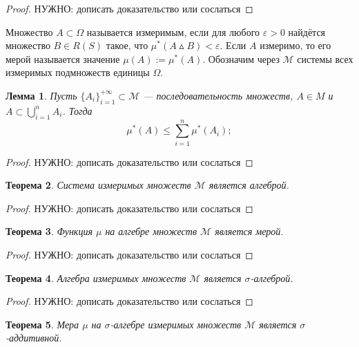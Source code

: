 \documentclass[12pt]{article}
\newtheorem{theorem}{Теорема}
\newtheorem{lemma}[theorem]{Лемма}
\numberwithin{theorem}{section}
\theoremstyle{definition}
\newcommand{\defin}[2]{\hypertarget{#2}{{\color{red} #1}}}
\newcommand{\calM}{\mathcal{M}}
\newcommand{\TODO}[1]{\textcolor{todocolor}{НУЖНО: #1}}
\begin{document}
	\begin{proof}
		\TODO{дописать доказательство или сослаться}
	\end{proof}
	
	Множество $ A \subset \Omega $ называется \defin{измеримым}{measurable-set}, если для любого $ \varepsilon > 0 $
	найдётся множество $ B \in R(S) $ такое, что $ \mu^*(A \vartriangle B) < \varepsilon $.
	Если $ A $ измеримо, то его \defin{мерой}{measure of set} называется значение $ \mu(A) := \mu^*(A) $.
	Обозначим через $ \calM $ системы всех измеримых подмножеств единицы $ \Omega $.
	
	\begin{lemma}
		Пусть $ \{A_i\}_{i = 1}^{+\infty} \subset \calM $ --- последовательность множеств,
		$ A \in M $
		и $ A \subset \bigcup\limits_{i = 1}^{n} A_i $.
		Тогда $$ \mu^*(A) \leqslant \sum\limits_{i = 1}^{n} \mu^*(A_i); $$
	\end{lemma}
	
	\begin{proof}
		\TODO{дописать доказательство или сослаться}
	\end{proof}
	
	\begin{theorem}
		Система измеримых множеств $ \calM $ является алгеброй.
	\end{theorem}
	
	\begin{proof}
		\TODO{дописать доказательство или сослаться}
	\end{proof}
	
	\begin{theorem}
		Функция $ \mu $ на алгебре множеств $ \calM $ является мерой.
	\end{theorem}
	
	\begin{proof}
		\TODO{дописать доказательство или сослаться}
	\end{proof}
	
	\begin{theorem}
		Алгебра измеримых множеств $ \calM $ является $ \sigma $-алгеброй.
	\end{theorem}
	
	\begin{proof}
		\TODO{дописать доказательство или сослаться}
	\end{proof}
	
	\begin{theorem}
		Мера $ \mu $ на $ \sigma $-алгебре измеримых множеств $ \calM $ является $ \sigma $-аддитивной.
	\end{theorem}
	
\end{document}
